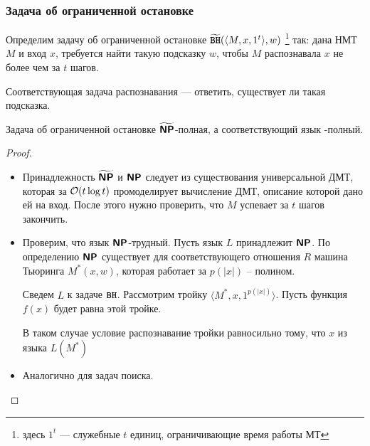 \subsubsection{Задача об ограниченной остановке}
\begin{defn}[\BH]
	Определим задачу об ограниченной остановке $ \widetilde{{\textbf{\texttt{BH}}}}(\langle M, x, 1^{t} \rangle, w)$ \footnote{здесь $ 1^{t}$ --- служебные $ t$ единиц, ограничивающие время работы МТ} так:
	дана НМТ $ M$ и вход $ x$, требуется найти такую подсказку $ w$, чтобы $ M$ распознавала $ x$ не более чем за $ t$ шагов.

	\noindent
	Соответствующая задача распознавания --- ответить, существует ли такая подсказка.
    \end{defn}
\begin{thm}
    Задача об ограниченной остановке $ \widetilde{\textmd{\textbf{\textsf{NP}}}}$-полная, а соответствующий язык \NP-полный.
\end{thm}
\begin{proof}
	\begin{itemize}
		\item Принадлежность $ \widetilde{\textmd{\textbf{\textsf{NP}}}}$ и $ \textmd{\textbf{\textsf{NP}}}$ следует из существования универсальной ДМТ, которая за $ \mathcal{O}(t \log t)$ промоделирует вычисление ДМТ, описание которой дано ей на вход. 
		После этого нужно проверить, что $M$ успевает за $t$ шагов закончить.
		\item Проверим, что язык  $ \textmd{\textbf{\textsf{NP}}}$-трудный.
			Пусть  язык $ L$ принадлежит $ \textmd{\textbf{\textsf{NP}}}$. По определению $\textmd{\textbf{\textsf{NP}}}$ существует для соответствующего отношения $ R$ машина Тьюринга $ M^{*}(x, w)$, которая работает за $ p(\lvert x \rvert )$ -- полином.

			Сведем $ L$ к задаче $ {\textbf{\texttt{BH}}}$. Рассмотрим тройку $ \langle M^{*}, x, 1^{p(\lvert x \rvert )} \rangle$. 
			Пусть функция $ f(x)$ будет равна этой тройке.

		  В таком случае условие распознавание тройки равносильно тому, что $ x$ из языка $L(M^*)$
		\item Аналогично для задач поиска.
    \end{itemize}
\end{proof}


